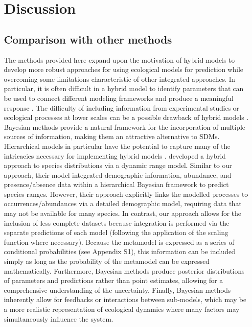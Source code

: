\documentclass[11pt]{article}
\newcommand{\rev}[1]{{\color{RoyalBlue}#1}}
\begin{document}
%
%



\section*{Discussion}

\subsection*{Comparison with other methods}
The methods provided here expand upon the motivation of hybrid models to develop more robust approaches for using ecological models for prediction while overcoming some limitations characteristic of other integrated approaches.
In particular, it is often difficult in a hybrid model to identify parameters that can be used to connect different modeling frameworks and produce a meaningful response \citep{Thuiller2013}. 
The difficulty of including information from experimental studies or ecological processes at lower scales can be a possible drawback of hybrid models \citep{Smolik2010, Thuiller2014a}. 
\rev{Bayesian methods provide a natural framework for the incorporation of multiple sources of information, making them an attractive alternative to SDMs.
Hierarchical models in particular have the potential to capture many of the intricacies necessary for implementing hybrid models \citep{Latimer2006}.
\citet{Pagel2012} developed a hybrid approach to species distributions via a dynamic range model.
Similar to our approach, their model integrated demographic information, abundance, and presence/absence data within a hierarchical Bayesian framework to predict species ranges.
However, their approach explicitly links the modelled processes to occurrences/abundances via a detailed demographic model, requiring data that may not be available for many species.
In contrast, our approach allows for the inclusion of less complete datasets because integration is performed via the separate predictions of each model (following the application of the scaling function where necessary).}
Because the metamodel is expressed as a series of conditional probabilities (see Appendix S1), this information can be included simply as long as the probability of the metamodel can be expressed mathematically.
Furthermore, Bayesian methods produce posterior distributions of parameters and predictions rather than point estimates, allowing for a comprehensive understanding of the uncertainty. 
Finally, Bayesian methods inherently allow for feedbacks or interactions between sub-models, which may be a more realistic representation of ecological dynamics where many factors may simultaneously influence the system.
\end{document}
